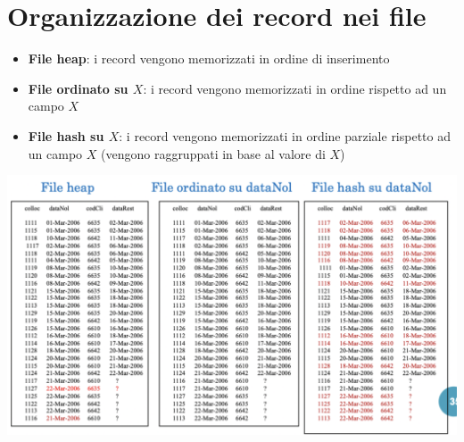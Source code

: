 \documentclass[12pt]{article}
\begin{document}
\section{Organizzazione dei record nei file}
\begin{itemize}
    \item \textbf{File heap}: i record vengono memorizzati in ordine di inserimento
    \item \textbf{File ordinato su $X$}: i record vengono memorizzati in ordine rispetto ad un campo $X$ 
    \item \textbf{File hash su $X$}: i record vengono memorizzati in ordine parziale rispetto ad un campo $X$ (vengono raggruppati in base al valore di $X$)
\end{itemize}
\begin{center}
    \includegraphics[width=\textwidth]{recordfile.png}
\end{center}
\end{document}
